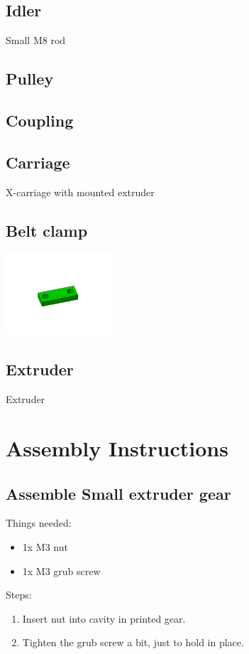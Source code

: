 \documentclass[11pt]{article}
\begin{document}
\hypertarget{thing_idler-m8-piece}{\subsection{Idler}}
Small M8 rod

\hypertarget{thing_pulley}{\subsection{Pulley}}

\hypertarget{thing_coupling}{\subsection{Coupling}}

\hypertarget{thing_carriage}{\subsection{Carriage}}
X-carriage with mounted extruder

\hypertarget{thing_belt-clamp}{\subsection{Belt clamp}}
\includegraphics[width=4cm]{images/belt-clamp.jpg}

\hypertarget{thing_extruder}{\subsection{Extruder}}
Extruder

\newpage

\section{Assembly Instructions}

\subsection{Assemble Small extruder gear}
Things needed:
\begin{itemize}
\item 1x M3 nut
\item 1x M3 grub screw
\end{itemize}
Steps:
\begin{enumerate}
\item Insert nut into cavity in printed gear.
\item Tighten the grub screw a bit, just to hold in place.
\end{enumerate}
\end{document}
